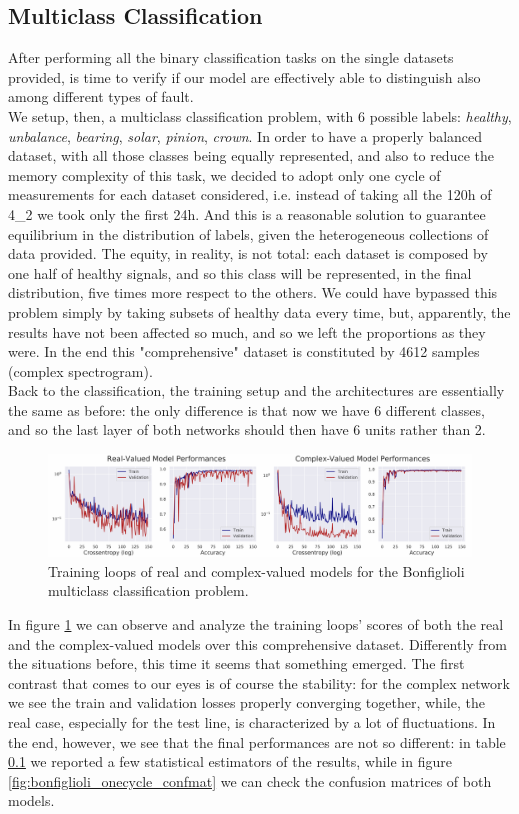 \documentclass[../main.tex]{subfiles}
\begin{document}
\subsection{Multiclass Classification}

After performing all the binary classification tasks on the single datasets provided, is time to verify if our model are effectively able to distinguish also among different types of fault.\\
We setup, then, a multiclass classification problem, with 6 possible labels: \textit{healthy}, \textit{unbalance}, \textit{bearing}, \textit{solar}, \textit{pinion}, \textit{crown}. In order to have a properly balanced dataset, with all those classes being equally represented, and also to reduce the memory complexity of this task, we decided to adopt only one cycle of measurements for each dataset considered, i.e. instead of taking all the 120h of 4\_2 we took only the first 24h. And this is a reasonable solution to guarantee equilibrium in the distribution of labels, given the heterogeneous collections of data provided. The equity, in reality, is not total: each dataset is composed by one half of healthy signals, and so this class will be represented, in the final distribution, five times more respect to the others. We could have bypassed this problem simply by taking subsets of healthy data every time, but, apparently, the results have not been affected so much, and so we left the proportions as they were. In the end this "comprehensive" dataset is constituted by 4612 samples (complex spectrogram). \\
Back to the classification, the training setup and the architectures are essentially the same as before: the only difference is that now we have 6 different classes, and so the last layer of both networks should then have 6 units rather than 2.
\begin{figure}[ht]
	\centering
	\includegraphics[width=\textwidth]{pictures/bonfiglioli_onecycle_results}
	\caption{Training loops of real and complex-valued models for the Bonfiglioli multiclass classification problem.}
	\label{fig:bonfiglioli_onecycle_results}
\end{figure}
In figure \ref{fig:bonfiglioli_onecycle_results} we can observe and analyze the training loops' scores of both the real and the complex-valued models over this comprehensive dataset. Differently from the situations before, this time it seems that something emerged. The first contrast that comes to our eyes is of course the stability: for the complex network we see the train and validation losses properly converging together, while, the real case, especially for the test line, is characterized by a lot of fluctuations. In the end, however, we see that the final performances are not so different: in table \ref{} we reported a few statistical estimators of the results, while in figure \ref{fig:bonfiglioli_onecycle_confmat} we can check the confusion matrices of both models.
\end{document}
